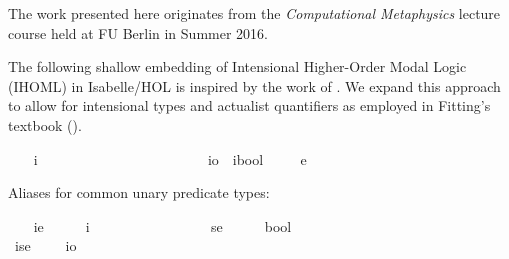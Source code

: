 \begin{isabellebody}
\begin{isamarkuptext}
The work presented here originates from the \emph{Computational Metaphysics} lecture course  
held at FU Berlin  in Summer 2016.%
\end{isamarkuptext}\isamarkuptrue%
%
\isamarkuptrue%
%
\begin{isamarkuptext}%
The following shallow embedding of Intensional Higher-Order Modal Logic (IHOML) in Isabelle/HOL is inspired by the work of \cite{J23}.
We expand this approach to allow for intensional types and actualist quantifiers as employed in Fitting's 
textbook (\cite{Fitting}).%
\end{isamarkuptext}\isamarkuptrue%
%
\isamarkuptrue%
\ \ \isamarkupfalse%
\ i\ \ \ \ \ \ \ \ \ \ \ \ \ \ \ \ \ \ \ \ %
\isanewline
\ \ \isamarkupfalse%
\ io\ {\isacharequal}\ {\isachardoublequoteopen}{\isacharparenleft}i{\isasymRightarrow}bool{\isacharparenright}{\isachardoublequoteclose}\ %
\isanewline
\ \ \isamarkupfalse%
\ e\ \ {\isacharparenleft}{\isachardoublequoteopen}{\isasymzero}{\isachardoublequoteclose}{\isacharparenright}\ \ \ \ \ \ \ \ \ \ \ \ \ %
%
\begin{isamarkuptext}%
Aliases for common unary predicate types:%
\end{isamarkuptext}\isamarkuptrue%
\ \ \isamarkupfalse%
\ ie\ {\isacharequal}\ \ \ \ \ {\isachardoublequoteopen}{\isacharparenleft}i{\isasymRightarrow}{\isasymzero}{\isacharparenright}{\isachardoublequoteclose}\ \ \ \ \ \ \ \ \ \ \ \ \ {\isacharparenleft}{\isachardoublequoteopen}{\isasymup}{\isasymzero}{\isachardoublequoteclose}{\isacharparenright}\isanewline
\ \ \isamarkupfalse%
\ se\ {\isacharequal}\ \ \ \ \ {\isachardoublequoteopen}{\isacharparenleft}{\isasymzero}{\isasymRightarrow}bool{\isacharparenright}{\isachardoublequoteclose}\ \ \ \ \ \ \ \ \ \ {\isacharparenleft}{\isachardoublequoteopen}{\isasymlangle}{\isasymzero}{\isasymrangle}{\isachardoublequoteclose}{\isacharparenright}\isanewline
\ \ \isamarkupfalse%
\ ise\ {\isacharequal}\ \ \ \ {\isachardoublequoteopen}{\isacharparenleft}{\isasymzero}{\isasymRightarrow}io{\isacharparenright}{\isachardoublequoteclose}\ \ \ \ \ \ \ \ \ \ \ {\isacharparenleft}{\isachardoublequoteopen}{\isasymup}{\isasymlangle}{\isasymzero}{\isasymrangle}{\isachardoublequoteclose}{\isacharparenright}\isanewline

\end{isabellebody}
